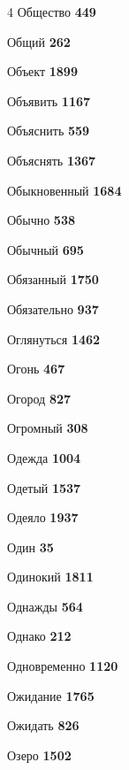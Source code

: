 \begin{multicols}{4}
\noindent Общество \dotfill \textbf{\color{secondary} 449}\par
\noindent Общий \dotfill \textbf{\color{secondary} 262}\par
\noindent Объект \dotfill \textbf{\color{secondary} 1899}\par
\noindent Объявить \dotfill \textbf{\color{secondary} 1167}\par
\noindent Объяснить \dotfill \textbf{\color{secondary} 559}\par
\noindent Объяснять \dotfill \textbf{\color{secondary} 1367}\par
\noindent Обыкновенный \dotfill \textbf{\color{secondary} 1684}\par
\noindent Обычно \dotfill \textbf{\color{secondary} 538}\par
\noindent Обычный \dotfill \textbf{\color{secondary} 695}\par
\noindent Обязанный \dotfill \textbf{\color{secondary} 1750}\par
\noindent Обязательно \dotfill \textbf{\color{secondary} 937}\par
\noindent Оглянуться \dotfill \textbf{\color{secondary} 1462}\par
\noindent Огонь \dotfill \textbf{\color{secondary} 467}\par
\noindent Огород \dotfill \textbf{\color{secondary} 827}\par
\noindent Огромный \dotfill \textbf{\color{secondary} 308}\par
\noindent Одежда \dotfill \textbf{\color{secondary} 1004}\par
\noindent Одетый \dotfill \textbf{\color{secondary} 1537}\par
\noindent Одеяло \dotfill \textbf{\color{secondary} 1937}\par
\noindent Один \dotfill \textbf{\color{secondary} 35}\par
\noindent Одинокий \dotfill \textbf{\color{secondary} 1811}\par
\noindent Однажды \dotfill \textbf{\color{secondary} 564}\par
\noindent Однако \dotfill \textbf{\color{secondary} 212}\par
\noindent Одновременно \dotfill \textbf{\color{secondary} 1120}\par
\noindent Ожидание \dotfill \textbf{\color{secondary} 1765}\par
\noindent Ожидать \dotfill \textbf{\color{secondary} 826}\par
\noindent Озеро \dotfill \textbf{\color{secondary} 1502}\par

\end{multicols}
